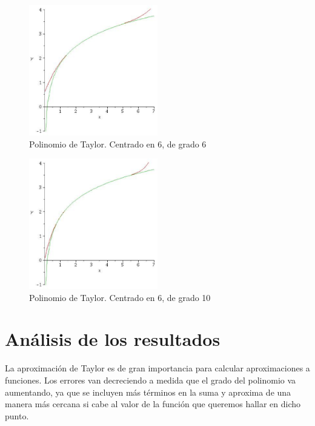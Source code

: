 \documentclass[a4paper,12pt]{report}
\begin{document}
\clearpage

\begin{figure}[t]
  \begin{center}
    \includegraphics[width=0.5\textwidth]{grafica6.eps}
    \caption{Polinomio de Taylor. Centrado en 6, de grado 6}
    \label{fig:ejemplo2}
  \end{center}
\end{figure}

\clearpage

\begin{figure}[t]
  \begin{center}
    \includegraphics[width=0.5\textwidth]{grafica10.eps}
    \caption{Polinomio de Taylor. Centrado en 6, de grado 10}
    \label{fig:ejemplo3}
  \end{center}
\end{figure}


\clearpage

\section{Análisis de los resultados}

La aproximación de Taylor es de gran importancia para calcular aproximaciones a funciones. Los errores van decreciendo a medida que el grado
del polinomio va aumentando, ya que se incluyen más términos en la suma y aproxima de una manera más cercana si cabe al valor de la función
que queremos hallar en dicho punto.
\end{document}
